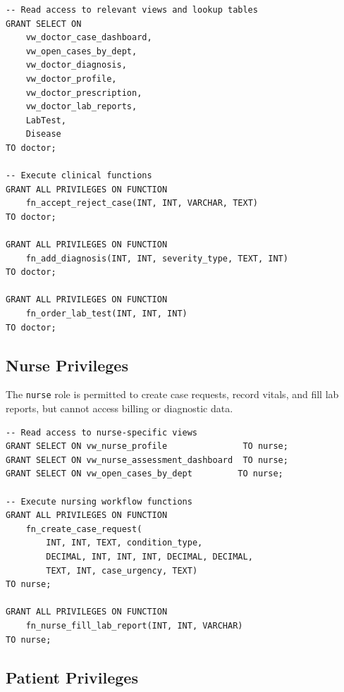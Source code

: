 \documentclass{article}
\begin{document}
\begin{lstlisting}
-- Read access to relevant views and lookup tables
GRANT SELECT ON
    vw_doctor_case_dashboard,
    vw_open_cases_by_dept,
    vw_doctor_diagnosis,
    vw_doctor_profile,
    vw_doctor_prescription,
    vw_doctor_lab_reports,
    LabTest,
    Disease
TO doctor;
 
-- Execute clinical functions
GRANT ALL PRIVILEGES ON FUNCTION
    fn_accept_reject_case(INT, INT, VARCHAR, TEXT)
TO doctor;
 
GRANT ALL PRIVILEGES ON FUNCTION
    fn_add_diagnosis(INT, INT, severity_type, TEXT, INT)
TO doctor;
 
GRANT ALL PRIVILEGES ON FUNCTION
    fn_order_lab_test(INT, INT, INT)
TO doctor;
\end{lstlisting}
 
\subsection{Nurse Privileges}
 
The \texttt{nurse} role is permitted to create case requests, record vitals, and fill lab reports, but cannot access billing or diagnostic data.
 
\begin{lstlisting}
-- Read access to nurse-specific views
GRANT SELECT ON vw_nurse_profile               TO nurse;
GRANT SELECT ON vw_nurse_assessment_dashboard  TO nurse;
GRANT SELECT ON vw_open_cases_by_dept         TO nurse;
 
-- Execute nursing workflow functions
GRANT ALL PRIVILEGES ON FUNCTION
    fn_create_case_request(
        INT, INT, TEXT, condition_type,
        DECIMAL, INT, INT, INT, DECIMAL, DECIMAL,
        TEXT, INT, case_urgency, TEXT)
TO nurse;
 
GRANT ALL PRIVILEGES ON FUNCTION
    fn_nurse_fill_lab_report(INT, INT, VARCHAR)
TO nurse;
\end{lstlisting}
 
\subsection{Patient Privileges}
 
\end{document}
